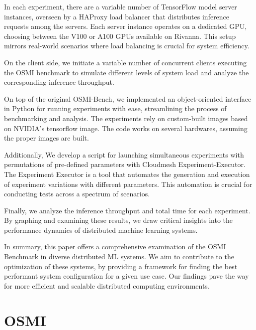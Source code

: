 \documentclass[sigplan,screen,noacm]{acmart}
\begin{document}
In each experiment, there are a variable number of TensorFlow model server instances, overseen by a HAProxy load balancer that distributes inference requests among the servers. Each server instance operates on a dedicated GPU, choosing between the V100 or A100 GPUs available on Rivanna. This setup mirrors real-world scenarios where load balancing is crucial for system efficiency.

On the client side, we initiate a variable number of concurrent clients executing the OSMI benchmark to simulate different levels of system load and analyze the corresponding inference throughput.

On top of the original OSMI-Bench, we implemented an object-oriented interface in Python for running experiments with ease, streamlining the process of benchmarking and analysis. The experiments rely on custom-built images based on NVIDIA's tensorflow image. The code works on several hardwares, assuming the proper images are built. 

Additionally, We develop a script for launching simultaneous experiments with permutations of pre-defined parameters with Cloudmesh Experiment-Executor. The Experiment Executor is a tool that automates the generation and execution of experiment variations with different parameters. This automation is crucial for conducting tests across a spectrum of scenarios.

Finally, we analyze the inference throughput and total time for each experiment. By graphing and examining these results, we draw critical insights into the performance dynamics of distributed machine learning systems. 

In summary, this paper offers a comprehensive examination of the OSMI Benchmark in diverse distributed ML systems. We aim to contribute to the optimization of these systems, by providing a framework for finding the best performant system configuration for a given use case. Our findings pave the way for more efficient and scalable distributed computing environments.

\section{OSMI}
\end{document}
